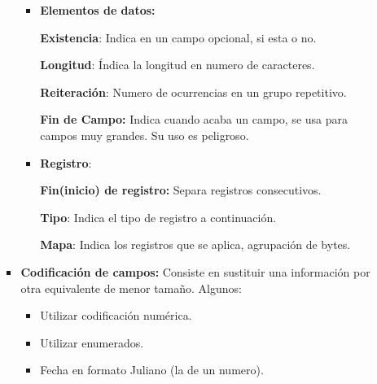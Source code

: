 \documentclass[12pt, twoside, openright]{report} %
\begin{document}
\begin{itemize}
\begin{itemize}
\begin{itemize}
          \begin{itemize}
          \item
            
            \textbf{Elementos de datos:}
            

           
              \textbf{Existencia}: Indica en un campo opcional, si esta
              o no.
            
			  
              \textbf{Longitud}: Índica la longitud en numero de
              caracteres.
             
			  
              \textbf{Reiteración}: Numero de ocurrencias en un grupo
              repetitivo.
            
			  
              \textbf{Fin de Campo:} Indica cuando acaba un campo, se
              usa para campos muy grandes. Su uso es peligroso.
             
			  
          \item
            
            \textbf{Registro}:
            

            
			
              \textbf{Fin(inicio) de registro:} Separa registros
              consecutivos.
             
			  
              \textbf{Tipo}: Indica el tipo de registro a continuación.
             
			  
              \textbf{Mapa}: Indica los registros que se aplica,
              agrupación de bytes.
              
			  
          \end{itemize}
        \item \textbf{Codificación de campos:} Consiste en sustituir una
          información por otra equivalente de menor tamaño. Algunos:
          

          \begin{itemize}
          \item
            
            Utilizar codificación numérica.
            
          \item
            
            Utilizar enumerados.
            
          \item
            
            Fecha en formato Juliano (la de un numero).
            

\end{itemize}
\end{itemize}
\end{itemize}
\end{itemize}
\end{document}
